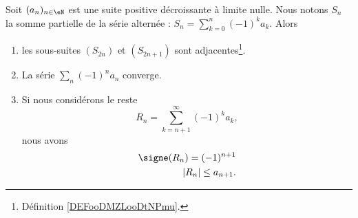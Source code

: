 \begin{theorem}      \label{THOooOHANooHYfkII}
	Soit \( (a_n)_{n\in \eN}\) est une suite positive décroissante à limite nulle. Nous notons \( S_n\) la somme partielle de la série alternée : \( S_n=\sum_{k=0}^n(-1)^ka_k\). Alors
	\begin{enumerate}
		\item
		      les sous-suites \( (S_{2n})\) et \( (S_{2n+1})\) sont adjacentes\footnote{Définition \ref{DEFooDMZLooDtNPmu}.}.
		\item		\label{ITEMooWNCXooWAYRdm}
		      La série \( \sum_n(-1)^na_n\) converge.
		\item       \label{ITEMooWEPWooXhLMYL}
		      Si nous considérons le reste
		      \begin{equation}
			      R_n=\sum_{k=n+1}^{\infty}(-1)^ka_k,
		      \end{equation}
		      nous avons
		      \begin{subequations}
			      \begin{align}
				      \signe(R_n)=(-1)^{n+1} \\
				      | R_n |\leq a_{n+1}.
			      \end{align}
		      \end{subequations}
	\end{enumerate}
\end{theorem}

